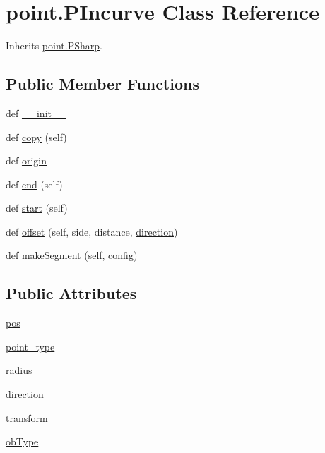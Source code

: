 \hypertarget{classpoint_1_1_p_incurve}{}\section{point.\+P\+Incurve Class Reference}
\label{classpoint_1_1_p_incurve}


Inherits \hyperlink{classpoint_1_1_p_sharp}{point.\+P\+Sharp}.

\subsection*{Public Member Functions}
\begin{DoxyCompactItemize}
\item 
def \hyperlink{classpoint_1_1_p_incurve_a3f4ee2a8024e5a17d2c7ddb0054effd9}{\+\_\+\+\_\+init\+\_\+\+\_\+}
\item 
def \hyperlink{classpoint_1_1_p_incurve_aa0d973a8467ef7e32947bd22d68fa74b}{copy} (self)
\item 
def \hyperlink{classpoint_1_1_p_incurve_aafd97b26697334873f8af1afbfa1aa38}{origin}
\item 
def \hyperlink{classpoint_1_1_p_incurve_a2c5d5baca83b512f63346c4c6ae33d49}{end} (self)
\item 
def \hyperlink{classpoint_1_1_p_incurve_a4dac0e1d4fcdd8e5520d216c16919ce4}{start} (self)
\item 
def \hyperlink{classpoint_1_1_p_incurve_acb6e9840cd462c68055031eac62405a5}{offset} (self, side, distance, \hyperlink{classpoint_1_1_p_incurve_a3e5b144147cb1c58419c74c123215c86}{direction})
\item 
def \hyperlink{classpoint_1_1_p_incurve_ac41e1b37c7aad7038e34e29ed2a9c554}{make\+Segment} (self, config)
\end{DoxyCompactItemize}
\subsection*{Public Attributes}
\begin{DoxyCompactItemize}
\item 
\hyperlink{classpoint_1_1_p_incurve_aa300bcf39a6e3b82a724c3ea532dca12}{pos}
\item 
\hyperlink{classpoint_1_1_p_incurve_a6dcb80908b7443c2c9b470d6e5a98ed9}{point\+\_\+type}
\item 
\hyperlink{classpoint_1_1_p_incurve_aa27d5e9be14491a217d09e1296e202bb}{radius}
\item 
\hyperlink{classpoint_1_1_p_incurve_a3e5b144147cb1c58419c74c123215c86}{direction}
\item 
\hyperlink{classpoint_1_1_p_incurve_afdbd3540560247be0149ed28085af94e}{transform}
\item 
\hyperlink{classpoint_1_1_p_incurve_a698319edd77b838033b96507ca3c01dc}{ob\+Type}
\end{DoxyCompactItemize}
